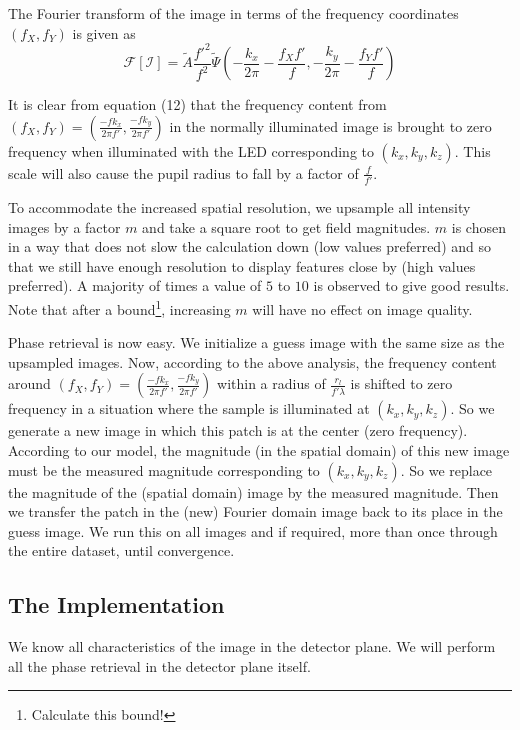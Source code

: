 \documentclass[11pt,a4paper,journal]{IEEEtran}
\begin{document}
The Fourier transform of the image in terms of the frequency coordinates $(f_X, f_Y)$ is given as 
\begin{equation}
\mathcal{F}[\mathcal{I}] = \tilde{A} \frac{f'^2}{f^2} \tilde{\Psi}\left(-\frac{k_x}{2\pi}-\frac{f_X f'}{f}, -\frac{k_y}{2\pi}-\frac{f_Y f'}{f}\right)
\end{equation}

It is clear from equation (12) that the frequency content from $(f_X, f_Y) = \left(\frac{-fk_x}{2\pi f'}, \frac{-fk_y}{2\pi f'}\right)$ in the normally illuminated image is brought to zero frequency when illuminated with the LED corresponding to $(k_x, k_y, k_z)$. This scale will also cause the pupil radius to fall by a factor of $\frac{f}{f'}$.

To accommodate the increased spatial resolution, we upsample all intensity images by a factor $m$ and take a square root to get field magnitudes. $m$ is chosen in a way that does not slow the calculation down (low values preferred) and so that we still have enough resolution to display features close by (high values preferred). A majority of times a value of $5$ to $10$ is observed to give good results. Note that after a bound\footnote{Calculate this bound!}, increasing $m$ will have no effect on image quality.

Phase retrieval is now easy. We initialize a guess image with the same size as the upsampled images. Now, according to the above analysis, the frequency content around $(f_X, f_Y) = \left(\frac{-fk_x}{2\pi f'}, \frac{-fk_y}{2\pi f'}\right)$ within a radius of $\frac{r_l}{f'\lambda}$ is shifted to zero frequency in a situation where the sample is illuminated at $(k_x, k_y, k_z)$. So we generate a new image in which this patch is at the center (zero frequency). According to our model, the magnitude (in the spatial domain) of this new image must be the measured magnitude corresponding to $(k_x, k_y, k_z)$. So we replace the magnitude of the (spatial domain) image by the measured magnitude. Then we transfer the patch in the (new) Fourier domain image back to its place in the guess image. We run this on all images and if required, more than once through the entire dataset, until convergence.

\subsection{The Implementation}
We know all characteristics of the image in the detector plane. We will perform all the phase retrieval in the detector plane itself.
\end{document}
